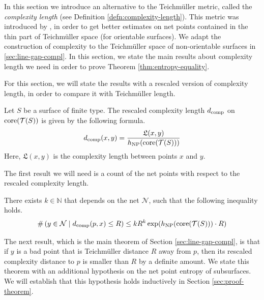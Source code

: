 \documentclass[12pt, reqno]{amsart}
\begin{document}
In this section we introduce an alternative to the Teichmüller metric, called the \emph{complexity length} (see Definition \ref{defn:complexity-length}).
This metric was introduced by \textcite{dowdall2023lattice}, in order to get better estimates on net points contained in the thin part of Teichmüller space (for orientable surfaces).
We adapt the construction of complexity to the Teichmüller space of non-orientable surfaces in \autoref{sec:line-gap-compl}.
In this section, we state the main results about complexity length we need in order to prove Theorem \ref{thm:entropy-equality}.

For this section, we will state the results with a rescaled version of complexity length, in order to compare it with Teichmüller length.

\begin{definition}
  Let $S$ be a surface of finite type.
  The rescaled complexity length $d_{\mathrm{comp}}$ on $\mathrm{core}(\mathcal{T}(S))$ is given by the following formula.
  \begin{align*}
    d_{\mathrm{comp}}(x, y) = \frac{\mathfrak{L}(x,y)}{h_{\mathrm{NP}}(\mathrm{core}(\mathcal{T}(S)))}
  \end{align*}
  Here, $\mathfrak{L}(x,y)$ is the complexity length between points $x$ and $y$.
\end{definition}

The first result we will need is a count of the net points with respect to the rescaled complexity length.

\begin{theorem}
  \label{thm:counting-with-complexity-rescaled}
  There exists $k \in \mathbb{N}$ that depends on the net $\mathcal{N}$, such that the following inequality holds.
  \begin{align*}
    \#\left( y \in \mathcal{N} \mid d_{\mathrm{comp}}(p, x) \leq R \right) \leq k R^k \exp(h_{\mathrm{NP}}(\mathrm{core}(\mathcal{T}(S))) \cdot R)
  \end{align*}
\end{theorem}

The next result, which is the main theorem of Section \ref{sec:line-gap-compl}, is that if $y$ is a bad point that is Teichmüller distance $R$ away from $p$, then its rescaled complexity distance to $p$ is smaller than $R$ by a definite amount.
We state this theorem with an additional hypothesis on the net point entropy of subsurfaces.
We will establish that this hypothesis holds inductively in Section \ref{sec:proof-theorem}.
\end{document}
